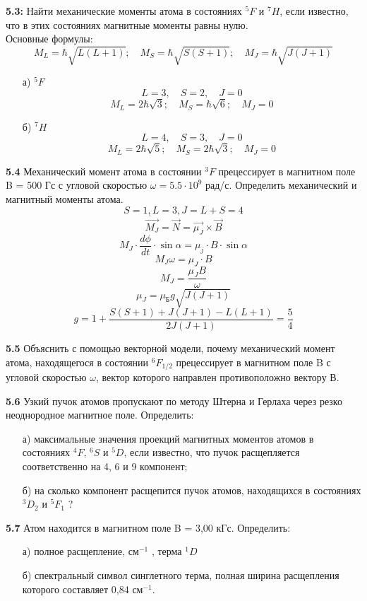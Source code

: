 	\textbf{5.3: }
		Найти механические моменты атома в состояниях \( ^5F \) и \( ^7H \), 
		если известно, что в этих состояниях магнитные моменты равны нулю.\\
		Основные формулы:
		\[
			M_L = \hbar\sqrt{L(L+1)};\quad
			M_S = \hbar\sqrt{S(S+1)};\quad
			M_J = \hbar\sqrt{J(J+1)}
		\]
		\begin{itemize}\itemsep-8pt
			\item[а)] \( ^5F \)
				\[ L = 3,\quad S = 2,\quad J = 0 \] 
				\[ 
					M_L = 2\hbar\sqrt{3};\quad
					M_S = \hbar\sqrt{6};\quad
					M_J = 0
				\]
			\item[б)] \( ^7H \)
				\[ L = 4,\quad S = 3,\quad J = 0 \] 
				\[ 
					M_L = 2\hbar\sqrt{5};\quad
					M_S = 2\hbar\sqrt{3};\quad
					M_J = 0
				\]
		\end{itemize}

	\textbf{5.4 }
		Механический момент атома в состоянии \( ^3F \) прецессирует 
		в магнитном поле B = 500 Гс с угловой скоростью 
		\( \omega = 5.5\cdot10^9 \) рад/с. Определить механический 
		и магнитный моменты атома.
		\[ S = 1, L = 3, J = L+S = 4 \]
		\[ \dot{\vec{M_J}} = \vec{N} = \vec{\mu_J}\times\vec{B} \]
		\[ M_J\cdot\frac{d\phi}{dt}\cdot\sin\alpha = \mu_j\cdot B\cdot\sin\alpha \]
		\[ M_J\omega = \mu_J\cdot B \]
		\[ M_J = \frac{\mu_JB}{\omega} \]
		\[ \mu_J = \mu_\text{Б}g\sqrt{J(J+1)} \]
		\[ g = 1 + \frac{S(S+1)+J(J+1)-L(L+1)}{2J(J+1)} = \frac{5}{4} \]

	\textbf{5.5 }
		Объяснить с помощью векторной модели, почему механический момент
		атома, находящегося в состоянии \(^6F_{1/2} \) прецессирует в 
		магнитном поле B с угловой скоростью \( \omega \), вектор 
		которого направлен противоположно вектору В.

	\textbf{5.6 }
		Узкий пучок атомов пропускают по методу Штерна и Герлаха через резко
		неоднородное магнитное поле. Определить: 
		\vspace*{-1em}
		\begin{itemize}\itemsep-8pt
			\item[а)] максимальные значения проекций магнитных моментов 
			атомов в состояниях \(^4F \), \( ^6S \) и \( ^5D \), если
			известно, что пучок расщепляется соответственно на 4, 6 и 9 компонент;
			\item[б)] на сколько компонент расщепится пучок атомов, 
			находящихся в состояниях \( ^3D_2 \) и \( ^5F_1 \) ?
		\end{itemize}

	\textbf{5.7 }
		Атом находится в магнитном поле B = 3,00 кГс. Определить: 
		\vspace*{-1em}
		\begin{itemize}\itemsep-8pt
			\item[а)] полное расщепление, \( \text{см}^{-1} \) , терма \( ^1D \) 
			\item[б)] спектральный символ синглетного терма,
			полная ширина расщепления которого составляет 0,84 \( \text{см}^{-1} \).
		\end{itemize}

